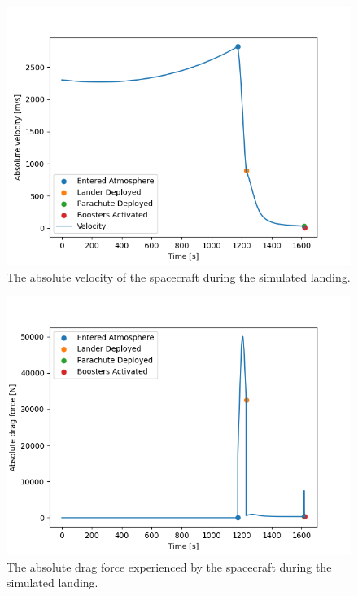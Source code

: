 \documentclass[reprint,english,notitlepage]{revtex4-2}
\begin{document}
\begin{figure}[h]
    \centering
    \includegraphics[scale=0.4]{Figures/sim_landing_velocity}
    \caption{The absolute velocity of the spacecraft during the simulated landing.}\label{fig:sim_landing_velocity}
\end{figure}

\begin{figure}[h]
    \centering
    \includegraphics[scale=0.4]{Figures/sim_landing_f_drag}
    \caption{The absolute drag force experienced by the spacecraft during the simulated landing.}\label{fig:sim_landing_f_drag}
\end{figure}
\end{document}
